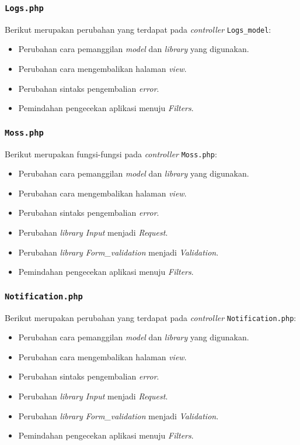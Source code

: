 \subsubsection{\texttt{Logs.php}}
Berikut merupakan perubahan yang terdapat pada \textit{controller} \texttt{Logs\_model}:
\begin{itemize}
	\item Perubahan cara pemanggilan \textit{model} dan \textit{library} yang digunakan.
	\item Perubahan cara mengembalikan halaman \textit{view}.
	\item Perubahan sintaks pengembalian \textit{error}.
	\item Pemindahan pengecekan aplikasi menuju \textit{Filters}.
\end{itemize}
\subsubsection{\texttt{Moss.php}}
Berikut merupakan fungsi-fungsi pada \textit{controller} \texttt{Moss.php}:
\begin{itemize}
	\item Perubahan cara pemanggilan \textit{model} dan \textit{library} yang digunakan.
	\item Perubahan cara mengembalikan halaman \textit{view}.
	\item Perubahan sintaks pengembalian \textit{error}.
	\item Perubahan \textit{library Input} menjadi \textit{Request}.
	\item Perubahan \textit{library Form\_validation} menjadi \textit{Validation}.
	\item Pemindahan pengecekan aplikasi menuju \textit{Filters}.
\end{itemize}
\subsubsection{\texttt{Notification.php}}
Berikut merupakan perubahan yang terdapat pada  \textit{controller} \texttt{Notification.php}:
\begin{itemize}
	\item Perubahan cara pemanggilan \textit{model} dan \textit{library} yang digunakan.
	\item Perubahan cara mengembalikan halaman \textit{view}.
	\item Perubahan sintaks pengembalian \textit{error}.
	\item Perubahan \textit{library Input} menjadi \textit{Request}.
	\item Perubahan \textit{library Form\_validation} menjadi \textit{Validation}.
	\item Pemindahan pengecekan aplikasi menuju \textit{Filters}.
\end{itemize}
